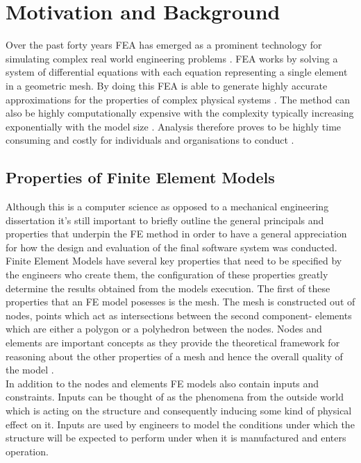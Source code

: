 
\section{Motivation and Background}
Over the past forty years FEA has emerged as a prominent technology for simulating complex real world engineering problems \cite{cite0, DolsakPaper94}. FEA works by solving a system of differential equations with each equation representing a single element in a geometric mesh. By doing this FEA is able to generate highly accurate approximations for the properties of complex physical systems \cite{DolsakPaper94} \cite{IntroductionToFE}. The method can also be highly computationally expensive with the complexity typically increasing exponentially with the model size \cite{DolsakPaper94}. Analysis therefore proves to be highly time consuming and costly for individuals and organisations to conduct \cite{ConsultRuleIntelltSystemFE} \cite{cite03}.\\


\subsection{Properties of Finite Element Models}
Although this is a computer science as opposed to a mechanical engineering dissertation it's still important to briefly outline the general principals and properties that underpin the FE method in order to have a general appreciation for how the design and evaluation of the final software system was conducted. \\ 

\noindent
Finite Element Models have several key properties that need to be specified by the engineers who create them, the configuration of these properties greatly determine the results obtained from the models execution. The first of these properties that an FE model posesses is the mesh. The mesh is constructed out of nodes, points which act as intersections between the second component- elements which are either a polygon or a polyhedron between the nodes. Nodes and elements are important concepts as they provide the theoretical framework for reasoning about the other properties of a mesh and hence the overall quality of the model \cite{IntroductionToFE}.\\ 

\noindent
In addition to the nodes and elements FE models also contain inputs and constraints. Inputs can be thought of as the phenomena from the outside world which is acting on the structure and consequently inducing some kind of physical effect on it. Inputs are used by engineers to model the conditions under which the structure will be expected to perform under when it is manufactured and enters operation. \\

